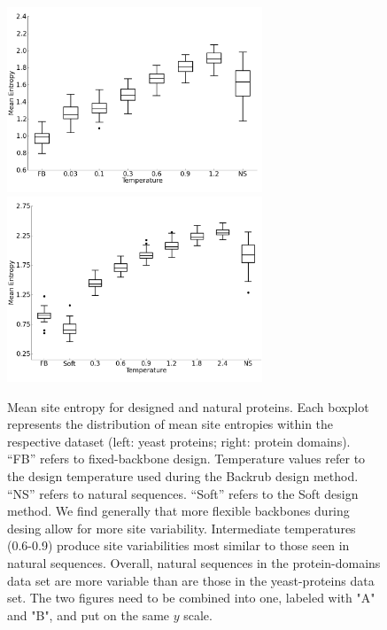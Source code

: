 \documentclass[12pt]{article}
\begin{document}
\begin{figure}[H]
\centerline{\includegraphics[width = 3in]{figures/Mean_Entropy_vs_Temp_Boxplot.png}\includegraphics[width = 3in]{figures/Mean_Entropy_vs_Temp_Boxplot_Noah.png}}
\caption{Mean site entropy for designed and natural proteins. Each boxplot represents the distribution of mean site entropies within the respective dataset (left: yeast proteins; right: protein domains). ``FB'' refers to fixed-backbone design. Temperature values refer to the design temperature used during the Backrub design method. ``NS'' refers to natural sequences. ``Soft'' refers to the Soft design method. We find generally that more flexible backbones during desing allow for more site variability. Intermediate temperatures (0.6-0.9) produce site variabilities most similar to those seen in natural sequences. Overall, natural sequences in the protein-domains data set are more variable than are those in the yeast-proteins data set. {\color{red}The two figures need to be combined into one, labeled with "A" and "B", and put on the same $y$ scale.}}
\label{MeanEntropyComparison}
\end{figure}
\end{document}
